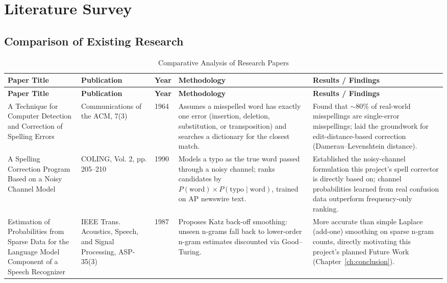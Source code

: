 \documentclass[12pt,a4paper]{report}
\begin{document}
\chapter{Literature Survey}

\section{Comparison of Existing Research}

\small
\begin{longtable}{
|p{3.4cm}|p{2.6cm}|p{1.0cm}|p{3.2cm}|p{3.2cm}|
}
\caption{Comparative Analysis of Research Papers}\\
\hline
\textbf{Paper Title} &
\textbf{Publication} &
\textbf{Year} &
\textbf{Methodology} &
\textbf{Results / Findings} \\
\hline
\endfirsthead

\hline
\textbf{Paper Title} &
\textbf{Publication} &
\textbf{Year} &
\textbf{Methodology} &
\textbf{Results / Findings} \\
\hline
\endhead

A Technique for Computer Detection and Correction of Spelling Errors &
Communications of the ACM, 7(3) &
1964 &
Assumes a misspelled word has exactly one error (insertion, deletion,
substitution, or transposition) and searches a dictionary for the closest
match. &
Found that $\sim$80\% of real-world misspellings are single-error
misspellings; laid the groundwork for edit-distance-based correction
(Damerau--Levenshtein distance). \\
\hline

A Spelling Correction Program Based on a Noisy Channel Model &
COLING, Vol. 2, pp. 205--210 &
1990 &
Models a typo as the true word passed through a noisy channel; ranks
candidates by $P(\text{word}) \times P(\text{typo}\mid\text{word})$,
trained on AP newswire text. &
Established the noisy-channel formulation this project's spell corrector
is directly based on; channel probabilities learned from real confusion
data outperform frequency-only ranking. \\
\hline

Estimation of Probabilities from Sparse Data for the Language Model
Component of a Speech Recognizer &
IEEE Trans. Acoustics, Speech, and Signal Processing, ASP-35(3) &
1987 &
Proposes Katz back-off smoothing: unseen n-grams fall back to
lower-order n-gram estimates discounted via Good--Turing. &
More accurate than simple Laplace (add-one) smoothing on sparse n-gram
counts, directly motivating this project's planned Future Work
(Chapter~\ref{ch:conclusion}). \\
\hline


\end{longtable}
\end{document}
